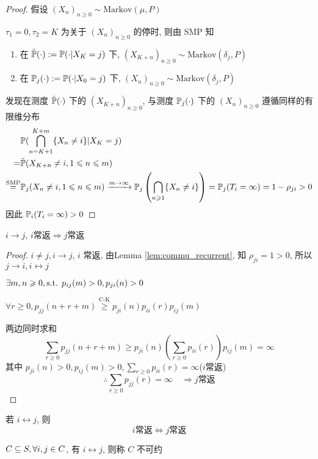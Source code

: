 \begin{proof}
假设 $(X_n)_{n\geq 0}\sim \text{Markov}(\mu,P)$

$\tau_1=0,\tau_2=K$ 为关于 $(X_n)_{n\geq 0}$ 的停时, 则由 SMP 知
\begin{enumerate}
    \item 在 $\tilde{\mathbb{P}}(\cdot):=\mathbb{P}(\cdot|X_K=j)$ 下, $(X_{K+n})_{n\geq 0}\sim \text{Markov}(\delta_j,P)$
    \item 在 $\mathbb{P}_j(\cdot):=\mathbb{P}(\cdot|X_0=j)$ 下, $(X_{n})_{n\geq 0}\sim \text{Markov}(\delta_j,P)$
\end{enumerate}
发现在测度 $\tilde{\mathbb{P}}(\cdot)$ 下的 $(X_{K+n})_{n\geq 0}$, 与测度 $\mathbb{P}_j(\cdot)$ 下的 $(X_n)_{n\geq 0}$ 遵循同样的有限维分布
\[
\begin{aligned}
    &\mathbb{P}(\bigcap_{n=K+1}^{K+m}\{X_n\neq i\}|X_K=j)\\
    =&\tilde{\mathbb{P}}(X_{K+n}\neq i,1\leqslant n\leqslant m)\\
    \overset{\text{SMP}}{=}&\mathbb{P}_j(X_n\neq i,1\leqslant n\leqslant m)\xrightarrow{m\to\infty}\mathbb{P}_j\left(\bigcap_{n\geqslant 1}\{X_n\neq i\}\right)=\mathbb{P}_j(T_i=\infty)=1-\rho_{ji}>0
\end{aligned}
\]
因此 $\mathbb{P}_i(T_i=\infty)>0$
\end{proof}
\begin{corollary}
    $i\to j$, $i$常返$\Rightarrow$$j$常返
\end{corollary}
\begin{proof}
$i\neq j,i\to j$, $i$ 常返, 由Lemma \ref{lem:commu_recurrent}, 知 $\rho_{ji}=1>0$, 所以 $j\to i, i\leftrightarrow j$

$\exists m,n\geqslant 0, \text{s.t. } p_{ij}(m)>0,p_{ji}(n)>0$

$\forall r\geq 0, p_{jj}(n+r+m)\overset{\text{C-K}}{\geq} p_{ji}(n)p_{ii}(r)p_{ij}(m)$

两边同时求和
\[
\sum_{r\geq 0}p_{jj}(n+r+m)\geq p_{ji}(n)\left(\sum_{r\geq 0}p_{ii}(r)\right)p_{ij}(m)=\infty
\]
其中 $p_{ji}(n)>0,p_{ij}(m)>0,\sum_{r\geq 0}p_{ii}(r)=\infty$($i$常返)
\[
\therefore \sum_{r\geq 0}p_{jj}(r)=\infty\quad \Rightarrow j\text{常返}
\]
\end{proof}

\begin{corollary}\label{cor:trans_recurrent}
    若 $i\leftrightarrow j$, 则 
    \[
    i \text{常返} \iff j \text{常返}
    \]
\end{corollary}

\begin{definition}[集合的不可约]
    $C\subseteq S,\forall i,j\in C$, 有 $i\leftrightarrow j$, 则称 $C$ 不可约
\end{definition}


